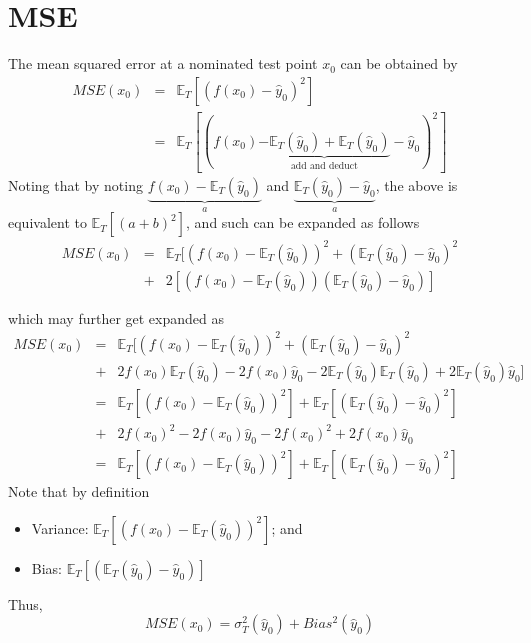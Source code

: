 \documentclass{beamer}
\newcommand{\E}{\mathbb{E}}
\begin{document}
\section{MSE}
\begin{frame}
The mean squared error at a nominated test point $x_0$ can be obtained by
\begin{eqnarray*}
MSE(x_0)&=&\E_{T}[(f(x_0)-\hat{y}_0)^2]\\
&=&\E_{T}[(f(x_0)\underbrace{-\E_T(\hat{y}_0)+\E_T(\hat{y}_0)}_{\text{add and deduct}}-\hat{y}_0)^2]
\end{eqnarray*}
Noting that by noting $\underbrace{f(x_0)-\E_T(\hat{y}_0)}_{a}$ and $\underbrace{\E_T(\hat{y}_0)-\hat{y}_0}_{a}$, the above is equivalent to $\E_T[(a+b)^2]$, and such can be expanded as follows
\begin{eqnarray*}
MSE(x_0)&=&\E_{T}[(f(x_0)-\E_T(\hat{y}_0))^2+(\E_T(\hat{y}_0)-\hat{y}_0)^2\\
&+&2[(f(x_0)-\E_T(\hat{y}_0))(\E_T(\hat{y}_0)-\hat{y}_0)]
\end{eqnarray*}
\end{frame}

\begin{frame}
which may further get expanded as
\begin{eqnarray*}
MSE(x_0)&=&\E_{T}[(f(x_0)-\E_T(\hat{y}_0))^2+(\E_T(\hat{y}_0)-\hat{y}_0)^2\\
&+&2f(x_0)\E_T(\hat{y}_0)-2f(x_0)\hat{y}_0-2\E_T(\hat{y}_0)\E_T(\hat{y}_0)+2\E_T(\hat{y}_0)\hat{y}_0]\\
&=&\E_{T}[(f(x_0)-\E_T(\hat{y}_0))^2]+\E_T[(\E_T(\hat{y}_0)-\hat{y}_0)^2]\\
&+&2f(x_0)^2-2f(x_0)\hat{y}_0-2f(x_0)^2+2f(x_0)\hat{y}_0\\
&=&\E_{T}[(f(x_0)-\E_T(\hat{y}_0))^2]+\E_T[(\E_T(\hat{y}_0)-\hat{y}_0)^2]
\end{eqnarray*}
Note that by definition
\begin{itemize}
\item{} Variance: $\E_{T}[(f(x_0)-\E_T(\hat{y}_0))^2]$; and
\item{} Bias: $\E_T[(\E_T(\hat{y}_0)-\hat{y}_0)]$
\end{itemize}
Thus,
\begin{equation}
MSE(x_0)=\sigma^2_T(\hat{y}_0)+Bias^2(\hat{y}_0)
\end{equation}
\end{frame}

%
%
\end{document}

